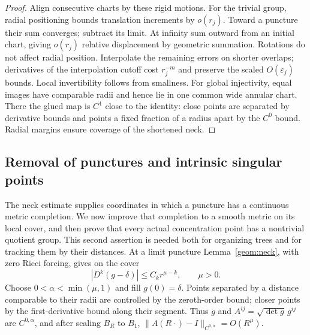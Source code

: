 \begin{proof}
Align consecutive charts by these rigid motions. For the trivial
group, radial positioning bounds translation increments by $o(r_j)$.
Toward a puncture their sum converges; subtract its limit. At infinity
sum outward from an initial chart, giving $o(r_j)$ relative displacement
by geometric summation. Rotations do not affect radial position.
Interpolate the remaining errors on shorter overlaps; derivatives
of the interpolation cutoff cost $r_j^{-m}$ and preserve the scaled
$O(\varepsilon_j)$ bounds. Local invertibility follows from smallness.
For global injectivity, equal images have comparable radii and hence
lie in one common wide annular chart. There the glued map is $C^1$
close to the identity: close points are separated by derivative
bounds and points a fixed fraction of a radius apart by the $C^0$
bound. Radial margins ensure coverage of the shortened neck.
\end{proof}

\subsection{Removal of punctures and intrinsic singular points}
\label{geom:puncture-removal}

The neck estimate supplies coordinates in which a puncture has a
continuous metric completion. We now improve that completion to a smooth
metric on its local cover, and then prove that every actual concentration
point has a nontrivial quotient group. This second assertion is needed
both for organizing trees and for tracking them by their distances.
At a limit puncture Lemma~\ref{geom:neck}, with zero Ricci forcing,
gives on the cover
\begin{equation}\label{geom:puncture-decay}
 |D^k(g-\delta)|\leq C_kr^{\mu-k},\qquad \mu>0.
\end{equation}
Choose $0<\alpha<\min(\mu,1)$ and fill $g(0)=\delta$. Points separated
by a distance comparable to their radii are controlled by the
zeroth-order bound; closer points by the first-derivative bound along
their segment. Thus $g$ and $A^{ij}=\sqrt{\det g}\,g^{ij}$ are
$C^{0,\alpha}$, and after scaling $B_R$ to $B_1$,
$\|A(R\cdot)-I\|_{C^{0,\alpha}}=O(R^\mu)$.


